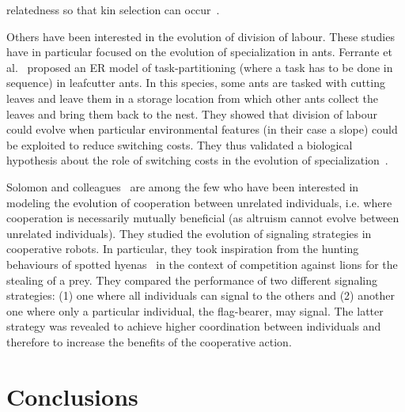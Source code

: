 relatedness so that kin selection can occur~\parencite{VanBaalen1998}. 

        Others have been interested in the evolution of division of labour. These studies have in particular focused on the evolution of specialization in ants. Ferrante et al.~\parencite{Ferrante2015} proposed an ER model of task-partitioning (where a task has to be done in sequence) in leafcutter ants. In this species, some ants are tasked with cutting leaves and leave them in a storage location from which other ants collect the leaves and bring them back to the nest. They showed that division of labour could evolve when particular environmental features (in their case a slope) could be exploited to reduce switching costs. They thus validated a biological hypothesis about the role of switching costs in the evolution of specialization~\parencite{Duarte2011}. 


        Solomon and colleagues~\parencite{Solomon2012} are among the few who have been interested in modeling the evolution of cooperation between unrelated individuals, i.e. where cooperation is necessarily mutually beneficial (as altruism cannot evolve between unrelated individuals). They studied the evolution of signaling strategies in cooperative robots. In particular, they took inspiration from the hunting behaviours of spotted hyenas~\parencite{Smith2012a} in the context of competition against lions for the stealing of a prey. They compared the performance of two different signaling strategies: (1) one where all individuals can signal to the others and (2) another one where only a particular individual, the flag-bearer, may signal. The latter strategy was revealed to achieve higher coordination between individuals and therefore to increase the benefits of the cooperative action.


\section{Conclusions}

